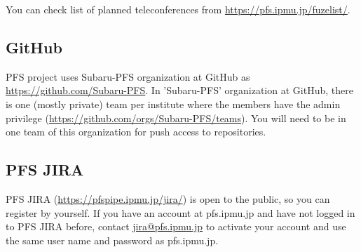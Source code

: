 \documentclass[a4paper,notitlepage]{article}
\begin{document}
You can check list of planned teleconferences from 
\url{https://pfs.ipmu.jp/fuzelist/}. 


\subsection{GitHub}

PFS project uses Subaru-PFS organization at GitHub 
as \url{https://github.com/Subaru-PFS}. 
In 'Subaru-PFS' organization at GitHub, 
there is one (mostly private) team per institute where the members have 
the admin privilege
(\url{https://github.com/orgs/Subaru-PFS/teams}). 
You will need to be in one team of this organization 
for push access to repositories. 


\subsection{PFS JIRA}

PFS JIRA (\url{https://pfspipe.ipmu.jp/jira/}) is open to the public, 
so you can register by yourself. 
If you have an account at pfs.ipmu.jp and have not logged in to PFS JIRA 
before, contact \url{jira@pfs.ipmu.jp} to activate your account and use 
the same user name and password as pfs.ipmu.jp. 
\end{document}
